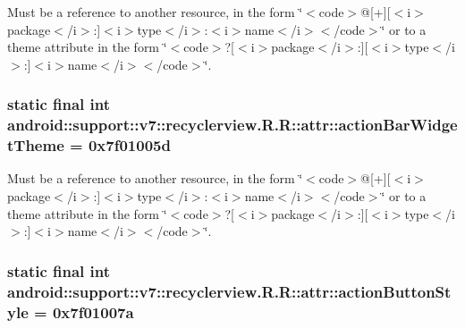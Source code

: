 Must be a reference to another resource, in the form \char`\"{}$<$code$>$@\mbox{[}+\mbox{]}\mbox{[}$<$i$>$package$<$/i$>$:\mbox{]}$<$i$>$type$<$/i$>$:$<$i$>$name$<$/i$>$$<$/code$>$\char`\"{} or to a theme attribute in the form \char`\"{}$<$code$>$?\mbox{[}$<$i$>$package$<$/i$>$:\mbox{]}\mbox{[}$<$i$>$type$<$/i$>$:\mbox{]}$<$i$>$name$<$/i$>$$<$/code$>$\char`\"{}. \hypertarget{classandroid_1_1support_1_1v7_1_1recyclerview_1_1_r_1_1attr_06665611ecfecca1b23c49f154f5049d}{
\subsubsection[{actionBarWidgetTheme}]{\setlength{\rightskip}{0pt plus 5cm}static final int android::support::v7::recyclerview.R.R::attr::actionBarWidgetTheme = 0x7f01005d}}
\label{classandroid_1_1support_1_1v7_1_1recyclerview_1_1_r_1_1attr_06665611ecfecca1b23c49f154f5049d}


Must be a reference to another resource, in the form \char`\"{}$<$code$>$@\mbox{[}+\mbox{]}\mbox{[}$<$i$>$package$<$/i$>$:\mbox{]}$<$i$>$type$<$/i$>$:$<$i$>$name$<$/i$>$$<$/code$>$\char`\"{} or to a theme attribute in the form \char`\"{}$<$code$>$?\mbox{[}$<$i$>$package$<$/i$>$:\mbox{]}\mbox{[}$<$i$>$type$<$/i$>$:\mbox{]}$<$i$>$name$<$/i$>$$<$/code$>$\char`\"{}. \hypertarget{classandroid_1_1support_1_1v7_1_1recyclerview_1_1_r_1_1attr_e9f69c3ee23149072600aa174956edbc}{
\subsubsection[{actionButtonStyle}]{\setlength{\rightskip}{0pt plus 5cm}static final int android::support::v7::recyclerview.R.R::attr::actionButtonStyle = 0x7f01007a}}
\label{classandroid_1_1support_1_1v7_1_1recyclerview_1_1_r_1_1attr_e9f69c3ee23149072600aa174956edbc}


